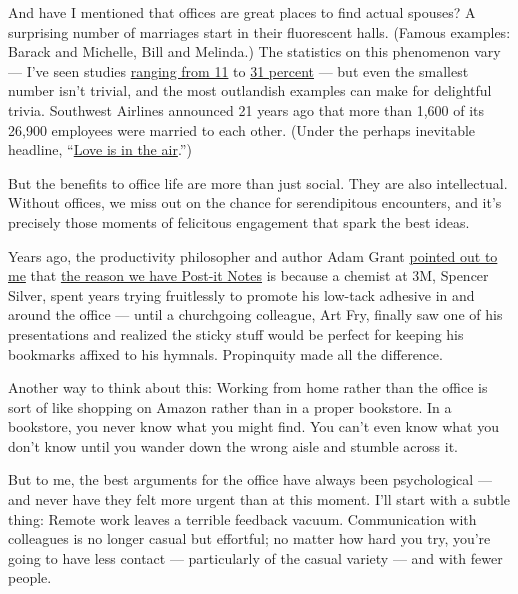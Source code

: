 And have I mentioned that offices are great places to find actual
spouses? A surprising number of marriages start in their fluorescent
halls. (Famous examples: Barack and Michelle, Bill and Melinda.) The
statistics on this phenomenon vary --- I've seen studies
\href{https://qz.com/1546677/around-40-of-us-couples-now-first-meet-online/}{ranging
from 11} to
\href{http://press.careerbuilder.com/2018-02-01-Office-Romance-Hits-10-Year-Low-According-to-CareerBuilders-Annual-Valentines-Day-Survey}{31
percent} --- but even the smallest number isn't trivial, and the most
outlandish examples can make for delightful trivia. Southwest Airlines
announced 21 years ago that more than 1,600 of its 26,900 employees were
married to each other. (Under the perhaps inevitable headline,
``\href{https://www.swamedia.com/releases/release-9a64e058fd5edca195eccf844b705447-Love-is-in-the-Air-at-Southwest-Airlines}{Love
is in the air}.'')

But the benefits to office life are more than just social. They are also
intellectual. Without offices, we miss out on the chance for
serendipitous encounters, and it's precisely those moments of felicitous
engagement that spark the best ideas.

Years ago, the productivity philosopher and author Adam Grant
\href{https://www.thecut.com/2015/01/what-we-give-up-when-we-become-entrepreneurs.html}{pointed
out to me} that
\href{https://www.cnn.com/2013/04/04/tech/post-it-note-history/index.html}{the
reason we have Post-it Notes} is because a chemist at 3M, Spencer
Silver, spent years trying fruitlessly to promote his low-tack adhesive
in and around the office --- until a churchgoing colleague, Art Fry,
finally saw one of his presentations and realized the sticky stuff would
be perfect for keeping his bookmarks affixed to his hymnals. Propinquity
made all the difference.

Another way to think about this: Working from home rather than the
office is sort of like shopping on Amazon rather than in a proper
bookstore. In a bookstore, you never know what you might find. You can't
even know what you don't know until you wander down the wrong aisle and
stumble across it.

But to me, the best arguments for the office have always been
psychological --- and never have they felt more urgent than at this
moment. I'll start with a subtle thing: Remote work leaves a terrible
feedback vacuum. Communication with colleagues is no longer casual but
effortful; no matter how hard you try, you're going to have less contact
--- particularly of the casual variety --- and with fewer people.

